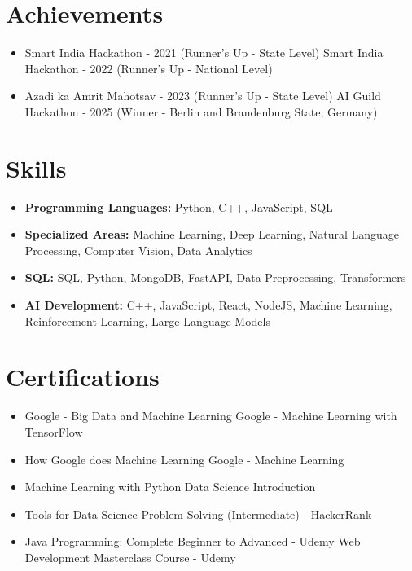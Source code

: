 \documentclass[a4paper,10pt]{article}
\begin{document}
\section*{Achievements}
\begin{itemize}
\item Smart India Hackathon - 2021 (Runner's Up - State Level) \hfill Smart India Hackathon - 2022 (Runner's Up - National Level)
\item Azadi ka Amrit Mahotsav - 2023 (Runner's Up - State Level) \hfill AI Guild Hackathon - 2025 (Winner - Berlin and Brandenburg State, Germany)
\end{itemize}

\section*{Skills}
\begin{itemize}
  \item \textbf{Programming Languages:} Python, C++, JavaScript, SQL
  \item \textbf{Specialized Areas:} Machine Learning, Deep Learning, Natural Language Processing, Computer Vision, Data Analytics
  \item \textbf{SQL:} SQL, Python, MongoDB, FastAPI, Data Preprocessing, Transformers
  \item \textbf{AI Development:} C++, JavaScript, React, NodeJS, Machine Learning, Reinforcement Learning, Large Language Models
\end{itemize}

\section*{Certifications}
\begin{itemize}
\item Google - Big Data and Machine Learning \hfill Google - Machine Learning with TensorFlow
\item How Google does Machine Learning \hfill Google - Machine Learning
\item Machine Learning with Python \hfill Data Science Introduction
\item Tools for Data Science \hfill Problem Solving (Intermediate) - HackerRank
\item Java Programming: Complete Beginner to Advanced - Udemy \hfill Web Development Masterclass Course - Udemy
\end{itemize}
\end{document}
